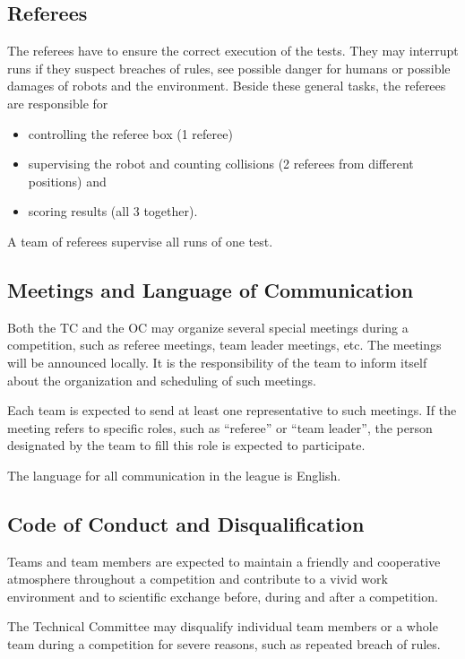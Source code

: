 \subsection{Referees}
The referees have to ensure the correct execution of the tests. They may interrupt runs if they suspect breaches of rules, see possible danger for humans or possible damages of robots and the environment. Beside these general tasks, the referees are responsible for
\begin{itemize}
\item controlling the referee box (1 referee)
\item supervising the robot and counting collisions (2 referees from different positions) and
\item scoring results (all 3 together).
\end{itemize}
A team of referees supervise all runs of one test. 


\subsection{Meetings and Language of Communication}
Both the TC and the OC may organize several special meetings during a competition, such as referee meetings, team leader meetings, etc. The meetings will be announced locally. It is the responsibility of the team to inform itself about the organization and scheduling of such meetings.
\par
Each team is expected to send at least one representative to such meetings. If the meeting refers to specific roles, such as “referee” or “team leader”, the person designated by the team to fill this role is expected to participate.
\par
The language for all communication in the league is English.

\subsection{Code of Conduct and Disqualification}
Teams and team members are expected to maintain a friendly and cooperative atmosphere throughout a competition and contribute to a vivid work environment and to scientific exchange before, during and after a competition.
\par
The Technical Committee may disqualify individual team members or a whole team during a competition for severe reasons, such as repeated breach of rules.
